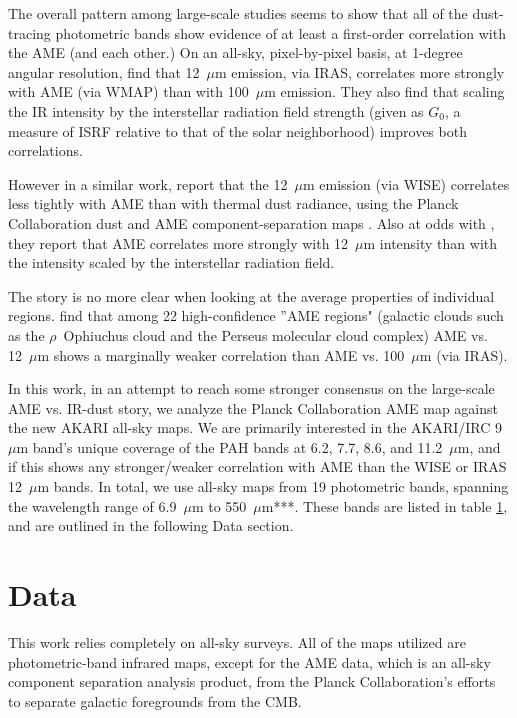 \documentclass[preprint2,longabstract]{aastex}
\begin{document}
    The overall pattern among large-scale studies seems to show that all of the dust-tracing photometric bands show evidence of at least a first-order correlation with the AME (and each other.) On an all-sky, pixel-by-pixel basis, at 1-degree angular resolution, \cite{ysard10b} find that 12~$\mu$m emission, via IRAS, correlates more strongly with AME (via WMAP) than with 100~$\mu$m emission. They also find that scaling the IR intensity by the interstellar radiation field strength (given as $G_0$, a measure of ISRF relative to that of the solar neighborhood) improves both correlations.

    However in a similar work, \cite{hensley16} report that the 12~$\mu$m emission (via WISE) correlates less tightly with AME than with thermal dust radiance, using the Planck Collaboration dust and AME component-separation maps \citep{planck15X}. Also at odds with \cite{ysard10b}, they report that AME correlates more strongly with 12~$\mu$m intensity than with the intensity scaled by the interstellar radiation field.

     The story is no more clear when looking at the average properties of individual regions. \cite{planckXV} find that among 22 high-confidence ''AME regions" (galactic clouds such as the $\rho$~Ophiuchus cloud and the Perseus molecular cloud complex) AME vs. 12~$\mu$m  shows a marginally weaker correlation than AME vs. 100~$\mu$m (via IRAS).

     In this work, in an attempt to reach some stronger consensus on the large-scale AME vs. IR-dust story, we analyze the Planck Collaboration AME map against the new AKARI all-sky maps.  We are primarily interested in the AKARI/IRC 9~$\mu$m band's unique coverage of the PAH bands at 6.2, 7.7, 8.6, and 11.2~$\mu$m, and if this shows any stronger/weaker correlation with AME than the WISE or IRAS 12~$\mu$m bands. In total, we use all-sky maps from 19 photometric bands, spanning the wavelength range of 6.9~$\mu$m to 550~$\mu$m***. These bands are listed in table \ref{sec:data}, and are outlined in the following Data section.


\section{Data}
\label{sec:data}

This work relies completely on all-sky surveys. All of the maps utilized are photometric-band infrared maps, except for the AME data, which is an all-sky component separation analysis product, from the Planck Collaboration's efforts to separate galactic foregrounds from the CMB.
\end{document}
